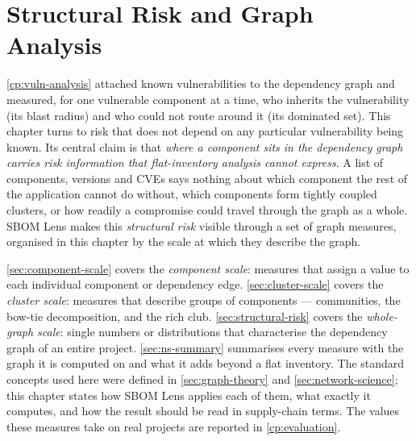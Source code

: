 \chapter[Structural Risk and Graph Analysis]{Structural Risk and Graph Analysis}
\label{cp:network-sci}

\autoref{cp:vuln-analysis} attached known vulnerabilities to the dependency graph and measured, for one vulnerable component at a time, who inherits the vulnerability (its blast radius) and who could not route around it (its dominated set). This chapter turns to risk that does not depend on any particular vulnerability being known. Its central claim is that \emph{where a component sits in the dependency graph carries risk information that flat-inventory analysis cannot express}. A list of components, versions and CVEs says nothing about which component the rest of the application cannot do without, which components form tightly coupled clusters, or how readily a compromise could travel through the graph as a whole. SBOM Lens makes this \textit{structural risk} visible through a set of graph measures, organised in this chapter by the scale at which they describe the graph.

\autoref{sec:component-scale} covers the \textit{component scale}: measures that assign a value to each individual component or dependency edge. \autoref{sec:cluster-scale} covers the \textit{cluster scale}: measures that describe groups of components --- communities, the bow-tie decomposition, and the rich club. \autoref{sec:structural-risk} covers the \textit{whole-graph scale}: single numbers or distributions that characterise the dependency graph of an entire project. \autoref{sec:ns-summary} summarises every measure with the graph it is computed on and what it adds beyond a flat inventory. The standard concepts used here were defined in \autoref{sec:graph-theory} and \autoref{sec:network-science}; this chapter states how SBOM Lens applies each of them, what exactly it computes, and how the result should be read in supply-chain terms. The values these measures take on real projects are reported in \autoref{cp:evaluation}.

